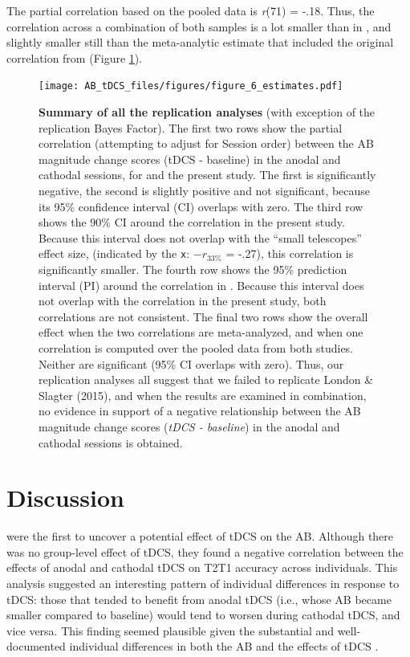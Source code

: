 \documentclass[11pt,]{memoir}
\begin{document}
The partial correlation based on the pooled data is \emph{r}(71) = -.18. Thus, the correlation across a combination of both samples is a lot smaller than in \textcite{London2015}, and slightly smaller still than the meta-analytic estimate that included the original correlation from \textcite{London2015} (Figure \ref{fig:fig-rep-estimate}).

\begin{figure}
\centering
\texttt{[image: AB\_tDCS\_files/figures/figure\_6\_estimates.pdf]}
\caption{\label{fig:fig-rep-estimate}\textbf{Summary of all the replication analyses} (with exception of the replication Bayes Factor). The first two rows show the partial correlation (attempting to adjust for Session order) between the AB magnitude change scores (tDCS - baseline) in the anodal and cathodal sessions, for \textcite{London2015} and the present study. The first is significantly negative, the second is slightly positive and not significant, because its 95\% confidence interval (CI) overlaps with zero. The third row shows the 90\% CI around the correlation in the present study. Because this interval does not overlap with the ``small telescopes'' effect size, (indicated by the \texttt{x}: \(-r_{33\%}\) = -.27), this correlation is significantly smaller. The fourth row shows the 95\% prediction interval (PI) around the correlation in \textcite{London2015}. Because this interval does not overlap with the correlation in the present study, both correlations are not consistent. The final two rows show the overall effect when the two correlations are meta-analyzed, and when one correlation is computed over the pooled data from both studies. Neither are significant (95\% CI overlaps with zero). Thus, our replication analyses all suggest that we failed to replicate London \& Slagter (2015), and when the results are examined in combination, no evidence in support of a negative relationship between the AB magnitude change scores (\emph{tDCS - baseline}) in the anodal and cathodal sessions is obtained.}
\end{figure}



\hypertarget{AB_tDCS-discussion}{%
\section{Discussion}\label{AB_tDCS-discussion}}

\textcite{London2015} were the first to uncover a potential effect of tDCS on the AB. Although there was no group-level effect of tDCS, they found a negative correlation between the effects of anodal and cathodal tDCS on T2\textbar{}T1 accuracy across individuals. This analysis suggested an interesting pattern of individual differences in response to tDCS: those that tended to benefit from anodal tDCS (i.e., whose AB became smaller compared to baseline) would tend to worsen during cathodal tDCS, and vice versa. This finding seemed plausible given the substantial and well-documented individual differences in both the AB \autocite{Willems2016} and the effects of tDCS \autocite{Krause2014}.
\end{document}
